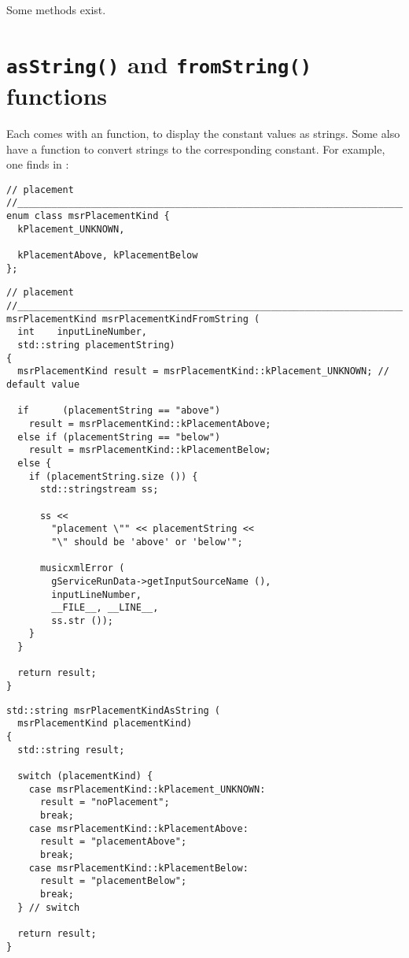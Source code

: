 Some  methods exist. %


\section{{\tt *asString()} and {\tt *fromString()} functions}

Each \enumType comes with an  function, to display the constant values as strings. Some also have a  function to convert strings to the corresponding constant. For example, one finds in :
\begin{lstlisting}[language=CPlusPlus]
// placement
//______________________________________________________________________________
enum class msrPlacementKind {
  kPlacement_UNKNOWN,

  kPlacementAbove, kPlacementBelow
};
\end{lstlisting}

\begin{lstlisting}[language=CPlusPlus]
// placement
//______________________________________________________________________________
msrPlacementKind msrPlacementKindFromString (
  int    inputLineNumber,
  std::string placementString)
{
  msrPlacementKind result = msrPlacementKind::kPlacement_UNKNOWN; // default value

  if      (placementString == "above")
    result = msrPlacementKind::kPlacementAbove;
  else if (placementString == "below")
    result = msrPlacementKind::kPlacementBelow;
  else {
    if (placementString.size ()) {
      std::stringstream ss;

      ss <<
        "placement \"" << placementString <<
        "\" should be 'above' or 'below'";

      musicxmlError (
        gServiceRunData->getInputSourceName (),
        inputLineNumber,
        __FILE__, __LINE__,
        ss.str ());
    }
  }

  return result;
}
\end{lstlisting}

\begin{lstlisting}[language=CPlusPlus]
std::string msrPlacementKindAsString (
  msrPlacementKind placementKind)
{
  std::string result;

  switch (placementKind) {
    case msrPlacementKind::kPlacement_UNKNOWN:
      result = "noPlacement";
      break;
    case msrPlacementKind::kPlacementAbove:
      result = "placementAbove";
      break;
    case msrPlacementKind::kPlacementBelow:
      result = "placementBelow";
      break;
  } // switch

  return result;
}
\end{lstlisting}

